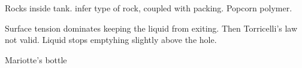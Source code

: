 \documentclass[openacc]{rsproca_new}%
\begin{document}
Rocks inside tank. infer type of rock, coupled with packing. Popcorn polymer.

Surface tension dominates keeping the liquid from exiting. Then Torricelli's law not valid. Liquid stops emptyhing slightly above the hole. 

Mariotte's bottle \cite{kirevs2006mariotte}

\enlargethispage{20pt}




\vskip2pc



\end{document}
